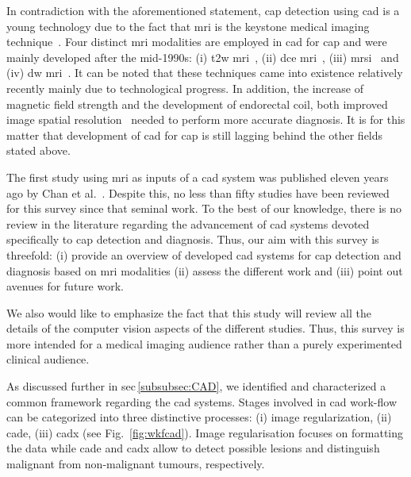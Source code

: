 In contradiction with the aforementioned statement, \ac{cap} detection using \acs{cad} is a young technology due to the fact that \ac{mri} is the keystone medical imaging technique~\cite{Hegde2013}. Four distinct \ac{mri} modalities are employed in \acs{cad} for \ac{cap} and were mainly developed after the mid-1990s: (i) \ac{t2w} \ac{mri}~\cite{Hricak1983}, (ii) \ac{dce} \ac{mri}~\cite{HuchBoni1995}, (iii) \ac{mrsi}~\cite{Kurhanewicz1996} and (iv) \ac{dw} \ac{mri}~\cite{Scheidler1999}. It can be noted that these techniques came into existence relatively recently mainly due to technological progress. In addition, the increase of magnetic field strength and the development of endorectal coil, both improved image spatial resolution~\cite{Swanson2001} needed to perform more accurate diagnosis. It is for this matter that development of \acs{cad} for \ac{cap} is still lagging behind the other fields stated above.

The first study using \ac{mri} as inputs of a \acs{cad} system was published eleven years ago by Chan et al.~\cite{Chan2003}. Despite this, no less than fifty studies have been reviewed for this survey since that seminal work. To the best of our knowledge, there is no review in the literature regarding the advancement of \acs{cad} systems devoted specifically to \ac{cap} detection and diagnosis. Thus, our aim with this survey is threefold: (i) provide an overview of developed \acs{cad} systems for \ac{cap} detection and diagnosis based on \ac{mri} modalities (ii) assess the different work and (iii) point out avenues for future work.

We also would like to emphasize the fact that this study will review all the details of the computer vision aspects of the different studies. Thus, this survey is more intended for a medical imaging audience rather than a purely experimented clinical audience.

As discussed further in \acs{sec}\,\ref{subsubsec:CAD}, we identified and characterized a common framework regarding the \acs{cad} systems. Stages involved in \acs{cad} work-flow can be categorized into three distinctive processes: (i) image regularization, (ii) \ac{cade}, (iii) \ac{cadx} (see Fig.~\ref{fig:wkfcad}). Image regularisation focuses on formatting the data while \ac{cade} and \ac{cadx} allow to detect possible lesions and distinguish malignant from non-malignant tumours, respectively.


